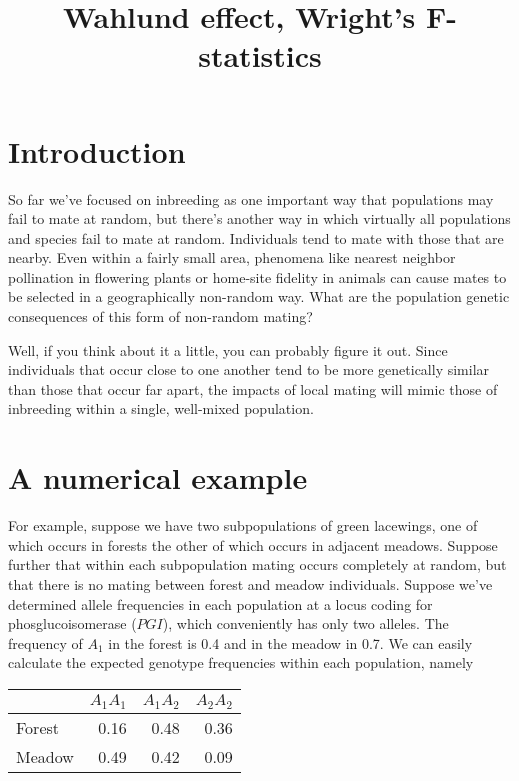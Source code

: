 \documentclass[12pt]{article}
\title{Wahlund effect, Wright's F-statistics}
\begin{document}
\maketitle

\thispagestyle{first}

\section*{Introduction}

So far we've focused on inbreeding as one important way that
populations may fail to mate at random, but there's another way in
which virtually all populations and species fail to mate at
random. Individuals tend to mate with those that are nearby. Even
within a fairly small area, phenomena like nearest neighbor
pollination in flowering plants or home-site fidelity in animals can
cause mates to be selected in a geographically non-random way. What
are the population genetic consequences of this form of non-random
mating?

Well, if you think about it a little, you can probably figure it
out. Since individuals that occur close to one another tend to be more
genetically similar than those that occur far apart, the impacts of
local mating will mimic those of inbreeding within a single,
well-mixed population. 

\section*{A numerical example}

For example, suppose we have two subpopulations of green lacewings,
one of which occurs in forests the other of which occurs in adjacent
meadows. Suppose further that within each subpopulation mating occurs
completely at random, but that there is no mating between forest and
meadow individuals. Suppose we've determined allele frequencies in
each population at a locus coding for phosglucoisomerase ($PGI$),
which conveniently has only two alleles. The frequency of $A_1$ in the
forest is 0.4 and in the meadow in 0.7. We can easily calculate the
expected genotype frequencies within each population,
namely

\begin{center}
\begin{tabular}{l|rrr}
\hline\hline
       & $A_1A_1$ & $A_1A_2$ & $A_2A_2$ \\
\hline
Forest &     0.16 &     0.48 &     0.36 \\
Meadow &     0.49 &     0.42 &     0.09 \\
\hline
\end{tabular}
\end{center}
\end{document}
